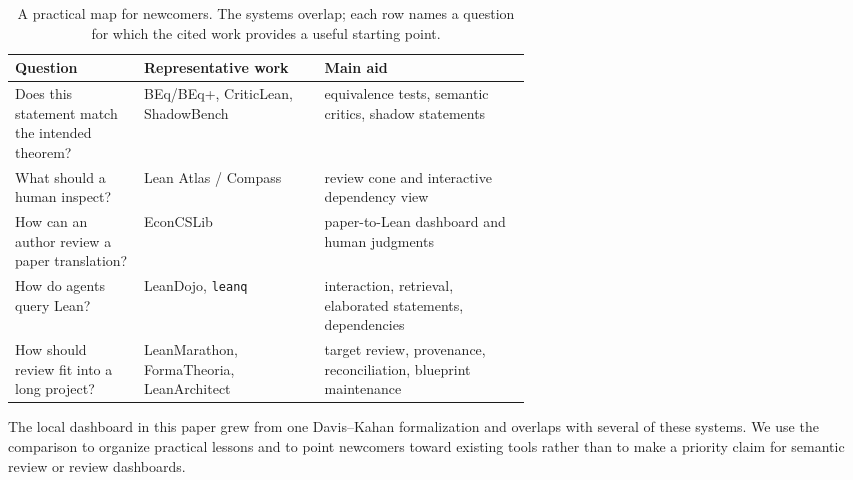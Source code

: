 \begin{table}[t]
\centering
\small
\caption{A practical map for newcomers.  The systems overlap; each row names a
question for which the cited work provides a useful starting point.}
\label{tab:tool-map}
\begin{tabularx}{\linewidth}{@{}P{0.25\linewidth}P{0.35\linewidth}Y@{}}
\toprule
Question & Representative work & Main aid \\
\midrule
Does this statement match the intended theorem? & BEq/BEq+, CriticLean, ShadowBench & equivalence tests, semantic critics, shadow statements \\
What should a human inspect? & Lean Atlas / Compass & review cone and interactive dependency view \\
How can an author review a paper translation? & EconCSLib & paper-to-Lean dashboard and human judgments \\
How do agents query Lean? & LeanDojo, \texttt{leanq} & interaction, retrieval, elaborated statements, dependencies \\
How should review fit into a long project? & LeanMarathon, FormaTheoria, LeanArchitect & target review, provenance, reconciliation, blueprint maintenance \\
\bottomrule
\end{tabularx}
\end{table}

The local dashboard in this paper grew from one Davis--Kahan formalization and
overlaps with several of these systems.  We use the comparison to organize
practical lessons and to point newcomers toward existing tools rather than to
make a priority claim for semantic review or review dashboards.
